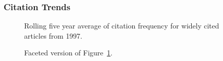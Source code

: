 \documentclass[
  10pt,
  letterpaper,
  DIV=11,
  numbers=noendperiod,
  twoside]{scrartcl}
\begin{document}
\subsubsection*{Citation Trends}\label{sec-trends-1997}

\begin{figure}


\caption{\label{fig-citation-spaghetti-1997}Rolling five year average of
citation frequency for widely cited articles from 1997.}

\end{figure}%

\begin{figure}


\caption{\label{fig-citation-facet-1997}Faceted version of
Figure~\ref{fig-citation-spaghetti-1997}.}

\end{figure}%
\end{document}
